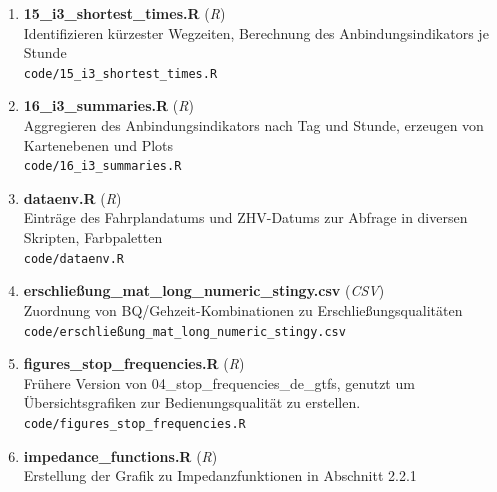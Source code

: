 \begin{enumerate}[label=B\arabic*, ref=B\arabic*, leftmargin=*, itemsep=0.5em, topsep=0.3em]
\begin{enumerate}[label=B\arabic{enumi}-\arabic*, ref=B\arabic{enumi}-\arabic*, leftmargin=*, itemsep=0.5em, topsep=0.3em]
Berechnung von ÖPNV-Wegzeiten (Zentrale Orte zu Zensuszellen)\\
\texttt{\small code/14\_i3\_traveltimes.R}
\edef\appendixlabelkey{app:B\arabic{enumi}-\arabic{enumii}}
\expandafter\label\expandafter{\appendixlabelkey}
\item \textbf{15\_i3\_shortest\_times.R} \textnormal{(\textit{R})}\\
Identifizieren kürzester Wegzeiten, Berechnung des Anbindungsindikators je Stunde\\
\texttt{\small code/15\_i3\_shortest\_times.R}
\edef\appendixlabelkey{app:B\arabic{enumi}-\arabic{enumii}}
\expandafter\label\expandafter{\appendixlabelkey}
\item \textbf{16\_i3\_summaries.R} \textnormal{(\textit{R})}\\
Aggregieren des Anbindungsindikators nach Tag und Stunde, erzeugen von Kartenebenen und Plots\\
\texttt{\small code/16\_i3\_summaries.R}
\edef\appendixlabelkey{app:B\arabic{enumi}-\arabic{enumii}}
\expandafter\label\expandafter{\appendixlabelkey}
\item \textbf{dataenv.R} \textnormal{(\textit{R})}\\
Einträge des Fahrplandatums und ZHV-Datums zur Abfrage in diversen Skripten, Farbpaletten\\
\texttt{\small code/dataenv.R}
\edef\appendixlabelkey{app:B\arabic{enumi}-\arabic{enumii}}
\expandafter\label\expandafter{\appendixlabelkey}
\item \textbf{erschließung\_mat\_long\_numeric\_stingy.csv} \textnormal{(\textit{CSV})}\\
Zuordnung von BQ/Gehzeit-Kombinationen zu Erschließungsqualitäten\\
\texttt{\small code/erschließung\_mat\_long\_numeric\_stingy.csv}
\edef\appendixlabelkey{app:B\arabic{enumi}-\arabic{enumii}}
\expandafter\label\expandafter{\appendixlabelkey}
\item \textbf{figures\_stop\_frequencies.R} \textnormal{(\textit{R})}\\
Frühere Version von 04\_stop\_frequencies\_de\_gtfs, genutzt um Übersichtsgrafiken zur Bedienungsqualität zu erstellen.\\
\texttt{\small code/figures\_stop\_frequencies.R}
\edef\appendixlabelkey{app:B\arabic{enumi}-\arabic{enumii}}
\expandafter\label\expandafter{\appendixlabelkey}
\item \textbf{impedance\_functions.R} \textnormal{(\textit{R})}\\
Erstellung der Grafik zu Impedanzfunktionen in Abschnitt 2.2.1\\

\end{enumerate}
\end{enumerate}

